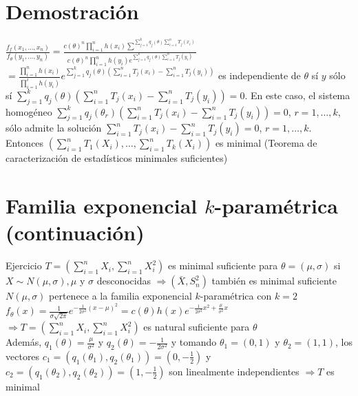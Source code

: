 \section*{Demostración}
$\frac{f_{f}\left(x_{1}, \ldots, x_{n}\right)}{f_{\theta}\left(y_{1}, \ldots, y_{n}\right)}=\frac{c(\theta)^{n} \prod_{i=1}^{n} h\left(x_{i}\right) \sum^{\sum_{j=1}^{k} q_{j}(\theta) \sum_{i=1}^{n} T_{j}\left(x_{i}\right)}}{c(\theta)^{n} \prod_{i=1}^{n} h\left(y_{i}\right) e^{\sum_{j=1}^{k} q_{j}(\theta) \sum_{i=1}^{n} T_{j}\left(y_{i}\right)}}$\\
$=\frac{\prod_{i=1}^{n} h\left(x_{i}\right)}{\prod_{i=1}^{i} h\left(y_{i}\right)} e^{\sum_{j=1}^{k} q_{j}(\theta)\left(\sum_{i=1}^{n} T_{j}\left(x_{i}\right)-\sum_{i=1}^{n} T_{j}\left(y_{i}\right)\right)}$ es independiente de $\theta$ sí $y$ sólo sí $\sum_{j=1}^{k} q_{j}(\theta)\left(\sum_{i=1}^{n} T_{j}\left(x_{i}\right)-\sum_{i=1}^{n} T_{j}\left(y_{i}\right)\right)=0$. En este caso, el sistema homogéneo $\sum_{j=1}^{k} q_{j}\left(\theta_{r}\right)\left(\sum_{i=1}^{n} T_{j}\left(x_{i}\right)-\sum_{i=1}^{n} T_{j}\left(y_{i}\right)\right)=0$, $r=1, \ldots, k$, sólo admite la solución $\sum_{i=1}^{n} T_{j}\left(x_{i}\right)-\sum_{i=1}^{n} T_{j}\left(y_{i}\right)=0$, $r=1, \ldots, k$. Entonces $\left(\sum_{i=1}^{n} T_{1}\left(X_{i}\right), \ldots, \sum_{i=1}^{n} T_{k}\left(X_{i}\right)\right)$ es minimal (Teorema de caracterización de estadísticos minimales suficientes)

\section*{Familia exponencial $k$-paramétrica (continuación)}
Ejercicio $T=\left(\sum_{i=1}^{n} X_{i}, \sum_{i=1}^{n} X_{i}^{2}\right)$ es minimal suficiente para $\theta=(\mu, \sigma)$ si $X \sim N(\mu, \sigma), \mu$ y $\sigma$ desconocidas $\Rightarrow\left(\bar{X}, S_{n}^{2}\right)$ también es minimal suficiente\\
$N(\mu, \sigma)$ pertenece a la familia exponencial $k$-paramétrica con $k=2$ $f_{\theta}(x)=\frac{1}{\sigma \sqrt{2 \pi}} e^{-\frac{1}{2 \sigma^{2}}(x-\mu)^{2}}=c(\theta) h(x) e^{-\frac{1}{2 \sigma^{2}} x^{2}+\frac{\mu}{\sigma^{2}} x}$\\
$\Rightarrow T=\left(\sum_{i=1}^{n} X_{i}, \sum_{i=1}^{n} X_{i}^{2}\right)$ es natural suficiente para $\theta$\\
Además, $q_{1}(\theta)=\frac{\mu}{\sigma^{2}}$ y $q_{2}(\theta)=-\frac{1}{2 \sigma^{2}}$ y tomando $\theta_{1}=(0,1)$ y $\theta_{2}=(1,1)$, los vectores $c_{1}=\left(q_{1}\left(\theta_{1}\right), q_{2}\left(\theta_{1}\right)\right)=\left(0,-\frac{1}{2}\right)$ y $c_{2}=\left(q_{1}\left(\theta_{2}\right), q_{2}\left(\theta_{2}\right)\right)=\left(1,-\frac{1}{2}\right)$ son linealmente independientes $\Rightarrow T$ es minimal

